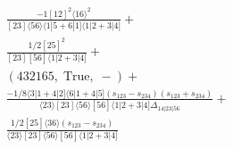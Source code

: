 \documentclass[varwidth, border=5pt]{standalone}
\begin{document}
\begin{my}
$\begin{gathered}
\scriptscriptstyle\frac{-1[12]^2⟨16⟩^2}{[23]⟨56⟩⟨1|5+6|1]⟨1|2+3|4]}+\\
\scriptscriptstyle\frac{1/2[25]^2}{[23][56]⟨1|2+3|4]}+\\
\scriptscriptstyle(432165,\;\text{True},\;-)+\\
\scriptscriptstyle\frac{-1/8⟨3|1+4|2]⟨6|1+4|5](s_{123}-s_{234})(s_{123}+s_{234})}{⟨23⟩[23]⟨56⟩[56]⟨1|2+3|4]Δ_{14|23|56}}+\\
\scriptscriptstyle\frac{1/2[25]⟨36⟩(s_{123}-s_{234})}{⟨23⟩[23]⟨56⟩[56]⟨1|2+3|4]}\phantom{+}
\end{gathered}$
\end{my}
\end{document}
